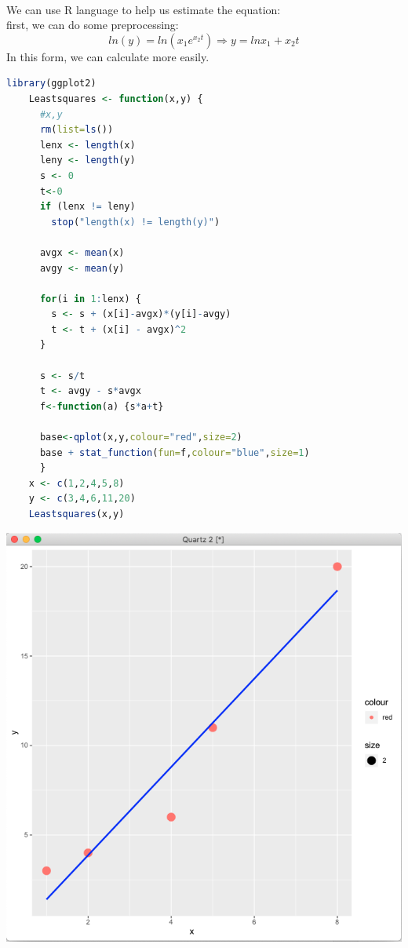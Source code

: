 \documentclass[11pt]{article}
\begin{document}
\paragraph{\color{red}{Answer:}}
  We can use R language to help us estimate the equation: \\
  first, we can do some preprocessing:
  $$
    ln(y) = ln(x_1 e^{x_2t}) \Rightarrow y = lnx_1 + x_2t
  $$
  In this form, we can calculate more easily.
  \begin{lstlisting}[language ={R}]
    library(ggplot2)
    Leastsquares <- function(x,y) {
      #x,y
      rm(list=ls())
      lenx <- length(x)
      leny <- length(y)
      s <- 0
      t<-0
      if (lenx != leny)
        stop("length(x) != length(y)")

      avgx <- mean(x)
      avgy <- mean(y)

      for(i in 1:lenx) {
        s <- s + (x[i]-avgx)*(y[i]-avgy)
        t <- t + (x[i] - avgx)^2
      }

      s <- s/t
      t <- avgy - s*avgx
      f<-function(a) {s*a+t}

      base<-qplot(x,y,colour="red",size=2)
      base + stat_function(fun=f,colour="blue",size=1)
      }
    x <- c(1,2,4,5,8)
    y <- c(3,4,6,11,20)
    Leastsquares(x,y)
  \end{lstlisting}
\includegraphics[width = .7\textwidth]{plot1.png} \\
\end{document}
